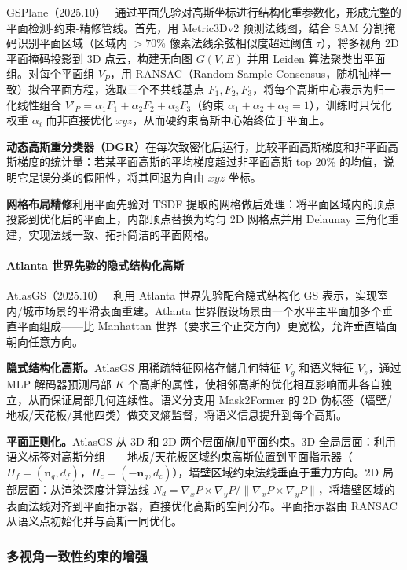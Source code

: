GSPlane（2025.10）~\cite{2510_17095} 通过平面先验对高斯坐标进行结构化重参数化，形成完整的平面检测-约束-精修管线。首先，用 Metric3Dv2 预测法线图，结合 SAM 分割掩码识别平面区域（区域内 $>70\%$ 像素法线余弦相似度超过阈值 $\tau$），将多视角 2D 平面掩码投影到 3D 点云，构建无向图 $G(V,E)$ 并用 Leiden 算法聚类出平面组。对每个平面组 $V_P$，用 RANSAC（Random Sample Consensus，随机抽样一致）拟合平面方程，选取三个不共线基点 $F_1, F_2, F_3$，将每个高斯中心表示为归一化线性组合 $V'_P = \alpha_1 F_1 + \alpha_2 F_2 + \alpha_3 F_3$（约束 $\alpha_1 + \alpha_2 + \alpha_3 = 1$），训练时只优化权重 $\alpha_i$ 而非直接优化 $xyz$，从而硬约束高斯中心始终位于平面上。

\textbf{动态高斯重分类器（DGR）}在每次致密化后运行，比较平面高斯梯度和非平面高斯梯度的统计量：若某平面高斯的平均梯度超过非平面高斯 top 20\% 的均值，说明它是误分类的假阳性，将其回退为自由 $xyz$ 坐标。

\textbf{网格布局精修}利用平面先验对 TSDF 提取的网格做后处理：将平面区域内的顶点投影到优化后的平面上，内部顶点替换为均匀 2D 网格点并用 Delaunay 三角化重建，实现法线一致、拓扑简洁的平面网格。

\paragraph{Atlanta 世界先验的隐式结构化高斯}

AtlasGS（2025.10）~\cite{2510_25129} 利用 Atlanta 世界先验配合隐式结构化 GS 表示，实现室内/城市场景的平滑表面重建。Atlanta 世界假设场景由一个水平主平面加多个垂直平面组成——比 Manhattan 世界（要求三个正交方向）更宽松，允许垂直墙面朝向任意方向。

\textbf{隐式结构化高斯。}AtlasGS 用稀疏特征网格存储几何特征 $V_g$ 和语义特征 $V_s$，通过 MLP 解码器预测局部 $K$ 个高斯的属性，使相邻高斯的优化相互影响而非各自独立，从而保证局部几何连续性。语义分支用 Mask2Former 的 2D 伪标签（墙壁/地板/天花板/其他四类）做交叉熵监督，将语义信息提升到每个高斯。

\textbf{平面正则化。}AtlasGS 从 3D 和 2D 两个层面施加平面约束。3D 全局层面：利用语义标签对高斯分组——地板/天花板区域约束高斯位置到平面指示器（$\Pi_f = (\mathbf{n}_g, d_f)$，$\Pi_c = (-\mathbf{n}_g, d_c)$），墙壁区域约束法线垂直于重力方向。2D 局部层面：从渲染深度计算法线 $N_d = \nabla_x P \times \nabla_y P / \|\nabla_x P \times \nabla_y P\|$，将墙壁区域的表面法线对齐到平面指示器，直接优化高斯的空间分布。平面指示器由 RANSAC 从语义点初始化并与高斯一同优化。

\subsubsection{多视角一致性约束的增强}

